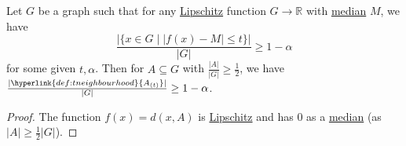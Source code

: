 \documentclass{article}
\let\subset\subseteq
\begin{document}
\begin{nprop}\label{prop:2.7}
  Let $G$ be a graph such that for any \hyperlink{def:lips}{Lipschitz} function $G \to \mathbb{R}$ with \hyperlink{def:median}{median} $M$, we have
  \begin{equation*}
    \frac{|\{x \in G \mid |f(x) - M| \leq t\}|}{|G|} \geq 1-\alpha
  \end{equation*}
  for some given $t,\alpha$.
  Then for $A \subset G$ with $\frac{|A|}{|G|} \geq \frac{1}{2}$, we have $\frac{|\hyperlink{def:tneighbourhood}{A_{(t)}}|}{|G|} \geq 1 - \alpha$.
\end{nprop}
\begin{proof}
  The function $f(x) = d(x,A)$ is \hyperlink{def:lips}{Lipschitz} and has $0$ as a \hyperlink{def:median}{median} (as $|A| \geq \frac{1}{2} |G|$).
\end{proof}
\end{document}
